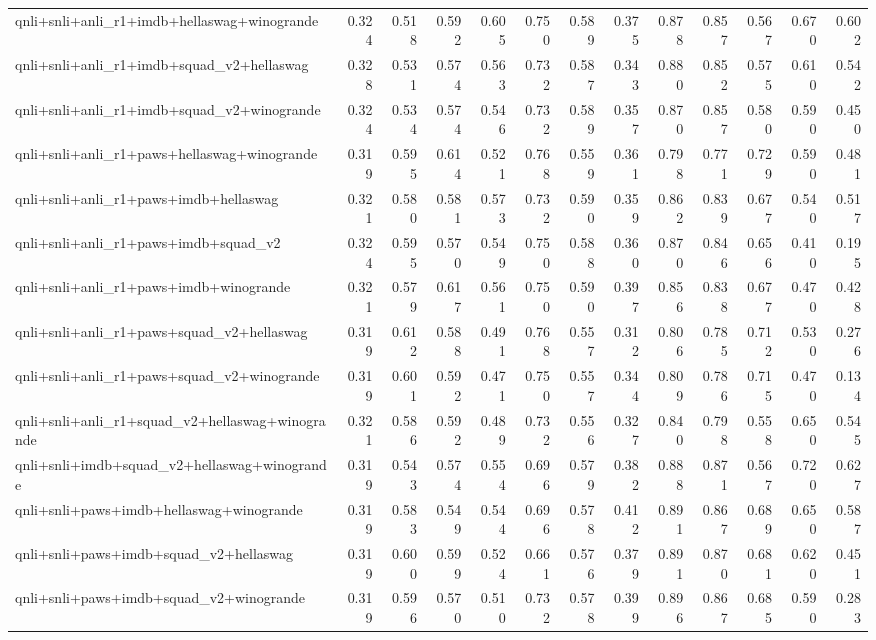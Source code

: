 \begin{table}[t]
\begin{tabular}{lrrrrrrrrrrrr}
    qnli+snli+anli\_r1+imdb+hellaswag+winogrande & 0.324 & 0.518 & 0.592 & 0.605 & 0.750 & 0.589 & 0.375 & 0.878 & 0.857 & 0.567 & 0.670 & 0.602 \\
    qnli+snli+anli\_r1+imdb+squad\_v2+hellaswag & 0.328 & 0.531 & 0.574 & 0.563 & 0.732 & 0.587 & 0.343 & 0.880 & 0.852 & 0.575 & 0.610 & 0.542 \\
    qnli+snli+anli\_r1+imdb+squad\_v2+winogrande & 0.324 & 0.534 & 0.574 & 0.546 & 0.732 & 0.589 & 0.357 & 0.870 & 0.857 & 0.580 & 0.590 & 0.450 \\
    qnli+snli+anli\_r1+paws+hellaswag+winogrande & 0.319 & 0.595 & 0.614 & 0.521 & 0.768 & 0.559 & 0.361 & 0.798 & 0.771 & 0.729 & 0.590 & 0.481 \\
    qnli+snli+anli\_r1+paws+imdb+hellaswag & 0.321 & 0.580 & 0.581 & 0.573 & 0.732 & 0.590 & 0.359 & 0.862 & 0.839 & 0.677 & 0.540 & 0.517 \\
    qnli+snli+anli\_r1+paws+imdb+squad\_v2 & 0.324 & 0.595 & 0.570 & 0.549 & 0.750 & 0.588 & 0.360 & 0.870 & 0.846 & 0.656 & 0.410 & 0.195 \\
    qnli+snli+anli\_r1+paws+imdb+winogrande & 0.321 & 0.579 & 0.617 & 0.561 & 0.750 & 0.590 & 0.397 & 0.856 & 0.838 & 0.677 & 0.470 & 0.428 \\
    qnli+snli+anli\_r1+paws+squad\_v2+hellaswag & 0.319 & 0.612 & 0.588 & 0.491 & 0.768 & 0.557 & 0.312 & 0.806 & 0.785 & 0.712 & 0.530 & 0.276 \\
    qnli+snli+anli\_r1+paws+squad\_v2+winogrande & 0.319 & 0.601 & 0.592 & 0.471 & 0.750 & 0.557 & 0.344 & 0.809 & 0.786 & 0.715 & 0.470 & 0.134 \\
    qnli+snli+anli\_r1+squad\_v2+hellaswag+winogrande & 0.321 & 0.586 & 0.592 & 0.489 & 0.732 & 0.556 & 0.327 & 0.840 & 0.798 & 0.558 & 0.650 & 0.545 \\
    qnli+snli+imdb+squad\_v2+hellaswag+winogrande & 0.319 & 0.543 & 0.574 & 0.554 & 0.696 & 0.579 & 0.382 & 0.888 & 0.871 & 0.567 & 0.720 & 0.627 \\
    qnli+snli+paws+imdb+hellaswag+winogrande & 0.319 & 0.583 & 0.549 & 0.544 & 0.696 & 0.578 & 0.412 & 0.891 & 0.867 & 0.689 & 0.650 & 0.587 \\
    qnli+snli+paws+imdb+squad\_v2+hellaswag & 0.319 & 0.600 & 0.599 & 0.524 & 0.661 & 0.576 & 0.379 & 0.891 & 0.870 & 0.681 & 0.620 & 0.451 \\
    qnli+snli+paws+imdb+squad\_v2+winogrande & 0.319 & 0.596 & 0.570 & 0.510 & 0.732 & 0.578 & 0.399 & 0.896 & 0.867 & 0.685 & 0.590 & 0.283 \\

\end{tabular}
\end{table}
